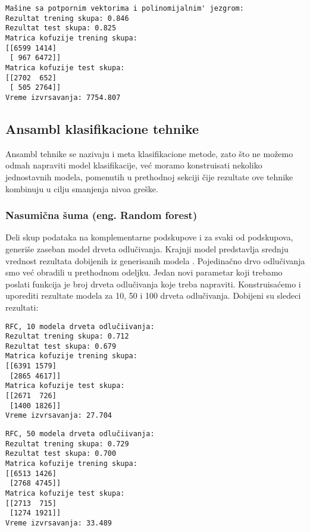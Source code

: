 \documentclass[a4paper]{article}
\begin{document}
\begin{tcolorbox}
\begin{verbatim}
Mašine sa potpornim vektorima i polinomijalnim' jezgrom:
Rezultat trening skupa: 0.846
Rezultat test skupa: 0.825
Matrica kofuzije trening skupa:
[[6599 1414]
 [ 967 6472]]
Matrica kofuzije test skupa:
[[2702  652]
 [ 505 2764]]
Vreme izvrsavanja: 7754.807
\end{verbatim}
\end{tcolorbox}




\subsection{Ansambl klasifikacione tehnike}
Ansambl tehnike se nazivaju i meta klasifikacione metode, zato što ne možemo odmah
napraviti model klasifikacije, već moramo konstruisati nekoliko jednostavnih modela, pomenutih
u prethodnoj sekciji čije rezultate ove tehnike kombinuju u cilju smanjenja nivoa greške.

\subsubsection{Nasumična šuma  (eng. Random forest)}
Deli skup podataka na komplementarne podskupove i za svaki od podskupova, generiše
zaseban model drveta odlučivanja. Krajnji model predstavlja srednju vrednost rezultata dobijenih
iz generisanih modela \cite{forest} . Pojedinačno drvo odlučivanja smo već obradili u prethodnom odeljku.
Jedan novi parametar koji trebamo poslati funkcija je broj drveta odlučivanja koje treba
napraviti. Konstruisaćemo i uporediti rezultate modela za 10, 50 i 100 drveta odlučivanja.
Dobijeni su sledeci rezultati:

\begin{tcolorbox}
\begin{verbatim}
RFC, 10 modela drveta odlučiivanja:
Rezultat trening skupa: 0.712
Rezultat test skupa: 0.679
Matrica kofuzije trening skupa:
[[6391 1579]
 [2865 4617]]
Matrica kofuzije test skupa:
[[2671  726]
 [1400 1826]]
Vreme izvrsavanja: 27.704
\end{verbatim}
\end{tcolorbox}

\begin{tcolorbox}
\begin{verbatim}
RFC, 50 modela drveta odlučiivanja:
Rezultat trening skupa: 0.729
Rezultat test skupa: 0.700
Matrica kofuzije trening skupa:
[[6513 1426]
 [2768 4745]]
Matrica kofuzije test skupa:
[[2713  715]
 [1274 1921]]
Vreme izvrsavanja: 33.489
\end{verbatim}
\end{tcolorbox}
\end{document}
